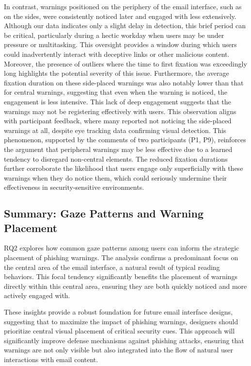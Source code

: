 \documentclass[
  a4paper,  %
  twoside,  %
  bibliography=totoc,
  headsepline,
  cleardoublepage=empty,
  parskip=half,
  draft=false
]{scrbook}
\begin{document}
In contrast, warnings positioned on the periphery of the email interface, such as on the sides, were consistently noticed later and engaged with less extensively. Although our data indicates only a slight delay in detection, this brief period can be critical, particularly during a hectic workday when users may be under pressure or multitasking. This oversight provides a window during which users could inadvertently interact with deceptive links or other malicious content. Moreover, the presence of outliers where the time to first fixation was exceedingly long highlights the potential severity of this issue. \newline
Furthermore, the average fixation duration on these side-placed warnings was also notably lower than that for central warnings, suggesting that even when the warning is noticed, the engagement is less intensive. This lack of deep engagement suggests that the warnings may not be registering effectively with users. This observation aligns with participant feedback, where many reported not noticing the side-placed warnings at all, despite eye tracking data confirming visual detection. \newline
This phenomenon, supported by the comments of two participants (P1, P9), reinforces the argument that peripheral warnings may be less effective due to a learned tendency to disregard non-central elements. The reduced fixation durations further corroborate the likelihood that users engage only superficially with these warnings when they do notice them, which could seriously undermine their effectiveness in security-sensitive environments.

\subsection{Summary: Gaze Patterns and Warning Placement}

RQ2 explores how common gaze patterns among users can inform the strategic placement of phishing warnings. The analysis confirms a predominant focus on the central area of the email interface, a natural result of typical reading behaviors. This focal tendency significantly benefits the placement of warnings directly within this central area, ensuring they are both quickly noticed and more actively engaged with.

These insights provide a robust foundation for future email interface designs, suggesting that to maximize the impact of phishing warnings, designers should prioritize central visual placement of critical security cues. This approach will significantly improve defense mechanisms against phishing attacks, ensuring that warnings are not only visible but also integrated into the flow of natural user interactions with email content.
\end{document}
